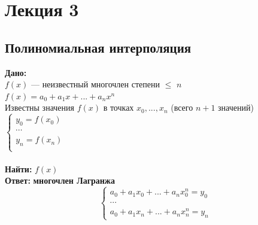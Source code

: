 
\newpage
\section{Лекция 3}
\subsection{Полиномиальная интерполяция}
\textbf{Дано:} \\$f(x)$ --- неизвестный многочлен степени $\leq$ $n$\\
$f(x) = a_{0}+a_1x+...+a_nx^n$ \\
Известны значения $f(x)$ в точках $x_0, ..., x_n$ (всего $n+1$ значений)\\ 
$
\left\{  
\begin{array}{ccl}  
y_0=f(x_0)\\
\cdots\\
y_n=f(x_n)\\  
\end{array}   
\right.  
$
\\
\\ \textbf{Найти:} $f(x)$
\\ \textbf{Ответ:} \textbf{многочлен Лагранжа} \\
\begin{equation*}
\begin{cases}
a_0+a_1x_0+...+a_nx_0^n = y_0\\
\cdots\\
a_0+a_1x_n+...+a_nx_n^n = y_n
\end{cases}
\end{equation*}

